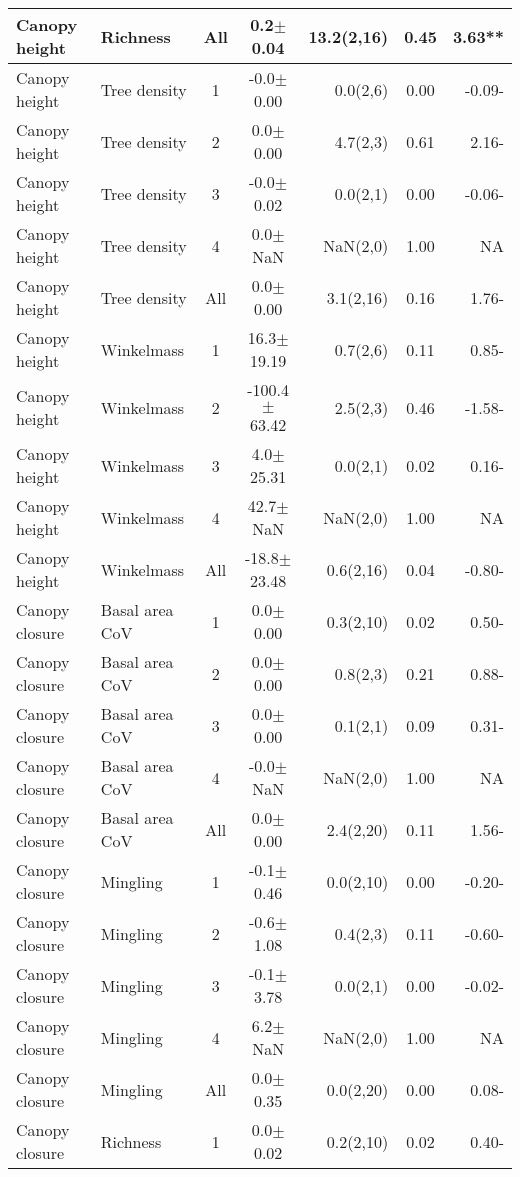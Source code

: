 \begin{longtable}{llcS[table-format=5.1(4.2)]rS[table-format=1.2]r}
  Canopy height & Richness & All & 0.2$\pm$0.04 & 13.2(2,16) & 0.45 & 3.63** \\ 
   \midrule
Canopy height & Tree density & 1 & -0.0$\pm$0.00 & 0.0(2,6) & 0.00 & -0.09- \\ 
  Canopy height & Tree density & 2 & 0.0$\pm$0.00 & 4.7(2,3) & 0.61 & 2.16- \\ 
  Canopy height & Tree density & 3 & -0.0$\pm$0.02 & 0.0(2,1) & 0.00 & -0.06- \\ 
  Canopy height & Tree density & 4 & 0.0$\pm$NaN & NaN(2,0) & 1.00 & NA \\ 
  Canopy height & Tree density & All & 0.0$\pm$0.00 & 3.1(2,16) & 0.16 & 1.76- \\ 
   \midrule
Canopy height & Winkelmass & 1 & 16.3$\pm$19.19 & 0.7(2,6) & 0.11 & 0.85- \\ 
  Canopy height & Winkelmass & 2 & -100.4$\pm$63.42 & 2.5(2,3) & 0.46 & -1.58- \\ 
  Canopy height & Winkelmass & 3 & 4.0$\pm$25.31 & 0.0(2,1) & 0.02 & 0.16- \\ 
  Canopy height & Winkelmass & 4 & 42.7$\pm$NaN & NaN(2,0) & 1.00 & NA \\ 
  Canopy height & Winkelmass & All & -18.8$\pm$23.48 & 0.6(2,16) & 0.04 & -0.80- \\ 
   \midrule
Canopy closure & Basal area CoV & 1 & 0.0$\pm$0.00 & 0.3(2,10) & 0.02 & 0.50- \\ 
  Canopy closure & Basal area CoV & 2 & 0.0$\pm$0.00 & 0.8(2,3) & 0.21 & 0.88- \\ 
  Canopy closure & Basal area CoV & 3 & 0.0$\pm$0.00 & 0.1(2,1) & 0.09 & 0.31- \\ 
  Canopy closure & Basal area CoV & 4 & -0.0$\pm$NaN & NaN(2,0) & 1.00 & NA \\ 
  Canopy closure & Basal area CoV & All & 0.0$\pm$0.00 & 2.4(2,20) & 0.11 & 1.56- \\ 
   \midrule
Canopy closure & Mingling & 1 & -0.1$\pm$0.46 & 0.0(2,10) & 0.00 & -0.20- \\ 
  Canopy closure & Mingling & 2 & -0.6$\pm$1.08 & 0.4(2,3) & 0.11 & -0.60- \\ 
  Canopy closure & Mingling & 3 & -0.1$\pm$3.78 & 0.0(2,1) & 0.00 & -0.02- \\ 
  Canopy closure & Mingling & 4 & 6.2$\pm$NaN & NaN(2,0) & 1.00 & NA \\ 
  Canopy closure & Mingling & All & 0.0$\pm$0.35 & 0.0(2,20) & 0.00 & 0.08- \\ 
   \midrule
Canopy closure & Richness & 1 & 0.0$\pm$0.02 & 0.2(2,10) & 0.02 & 0.40- \\ 

\end{longtable}
